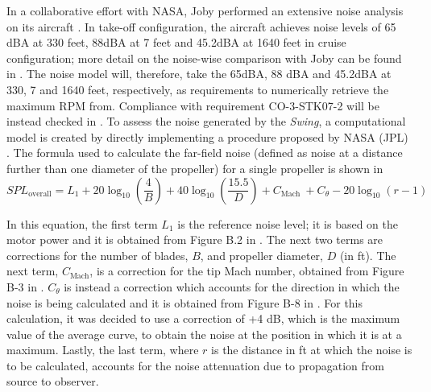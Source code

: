 In a collaborative effort with NASA, Joby performed an extensive noise analysis on its aircraft \cite{nasaxjoby2022acoustic}.
In take-off configuration, the aircraft achieves noise levels of 65 dBA at 330 feet, 88dBA at 7 feet and 45.2dBA at 1640 feet in cruise configuration; more detail on the noise-wise comparison with Joby can be found in .
The noise model will, therefore, take the 65dBA, 88 dBA and 45.2dBA at 330, 7 and 1640 feet, respectively, as requirements to numerically retrieve the maximum RPM from.
Compliance with requirement CO-3-STK07-2 will be instead checked in .
To assess the noise generated by the \textit{Swing}, a computational model is created by directly implementing a procedure proposed by NASA (JPL) \cite{noiseNASA}.
The formula used to calculate the far-field noise (defined as noise at a distance further than one diameter of the propeller) for a single propeller is shown in 
\begin{equation}
    \label{eq:farfieldnoise}
    S P L_{\text{overall}}=L_1+20 \log _{10}\left(\frac{4}{B}\right)+40 \log _{10}\left(\frac{15.5}{D}\right)+C_{\text {Mach }}+C_\theta-20 \log _{10}(r-1)
\end{equation}

In this equation, the first term $L_1$ is the reference noise level; it is based on the motor power and it is obtained from Figure B.2 in \cite{noiseNASA}.
The next two terms are corrections for the number of blades, $B$, and propeller diameter, $D$ (in ft).
The next term, $C_{\text{Mach}}$, is a correction for the tip Mach number, obtained from Figure B-3 in \cite{noiseNASA}. $C_{\theta}$ is instead a correction which accounts for the direction in which the noise is being calculated and it is obtained from Figure B-8 in \cite{noiseNASA}.
For this calculation, it was decided to use a correction of +4 dB, which is the maximum value of the average curve, to obtain the noise at the position in which it is at a maximum.
Lastly, the last term, where $r$ is the distance in ft at which the noise is to be calculated, accounts for the noise attenuation due to propagation from source to observer.

